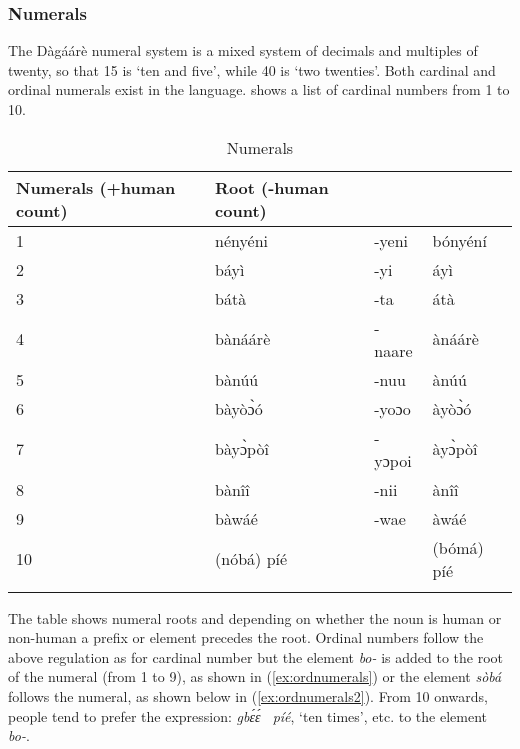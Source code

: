 \begin{refsection}
\subsubsection{Numerals}
The Dàgáárè numeral system is a mixed system of decimals and multiples of twenty,
so that 15 is ‘ten and five’, while 40 is ‘two twenties’. Both cardinal and ordinal numerals exist
in the language.  shows a list of cardinal numbers from 1 to 10.
\begin{table}[]
    \centering
    \begin{tabular}{llll}\lsptoprule
Numerals (+human count) & Root (-human count) \\\midrule
1 &nényéni &-yeni& bónyéní \\
2 &báyì &-yi&  áyì\\
3 &bátà &-ta& átà \\
4 &bànáárè& -naare& ànáárè\\
5 &bànúú &-nuu& ànúú\\
6 &bàyòɔ̀ó& -yoɔo& àyòɔ̀ó \\
7 &bàyɔ̀pòî& -yɔpoi& àyɔ̀pòî \\
8 &bànîî &-nii & ànîî \\
9 &bàwáé &-wae& àwáé \\
10 &(nóbá) píé&& (bómá) píé\\\lspbottomrule
\end{tabular}
    \caption{Numerals}
    \label{tab:numerals}
\end{table}  



The table shows numeral roots and depending on whether the noun is human or non-human a
prefix or element precedes the root. Ordinal numbers follow the above regulation as for
cardinal number but the element \textit{bo-} is added to the root of the numeral (from 1 to 9), as
shown in (\ref{ex:ordnumerals}) or the element \textit{sòbá}  follows the numeral, as shown below in (\ref{ex:ordnumerals2}). From 10
onwards, people tend to prefer the expression: \textit{gbɛ́ɛ́~ píé}, ‘ten times’, etc. to the element \textit{bo-}.

\ea {}
\z\z


\end{refsection}
